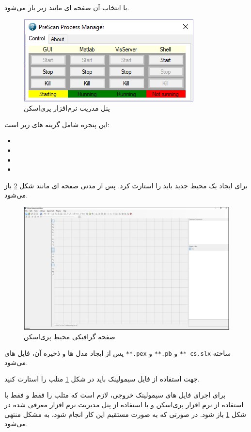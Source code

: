 با انتخاب آن صفحه ای مانند زیر باز می‌شود.

\begin{figure}[h]
	\centering
	\includegraphics[width=0.5\linewidth]{Figures/Prescan-panel}
	\caption{پنل مدریت نرم‌افزار پری‌اسکن}
	\label{fig:prescan-panel}
\end{figure}

این پنجره شامل گزینه های زیر است:
\begin{multicols}{2}
	\begin{itemize}
		\item {}
		\item {}
		\item {}
		\item {}
	\end{itemize}
\end{multicols}

برای ایجاد یک محیط جدید باید  را استارت کرد. پس از مدتی صفحه ای مانند شکل 
\ref{fig:prescan-gui}
باز می‌شود. 


\begin{figure}
	\centering
	\includegraphics[width=0.7\linewidth]{Figures/Prescan-GUI}
	\caption{صفحه گرافیکی محیط پری‌اسکن}
	\label{fig:prescan-gui}
\end{figure}

پس از ایجاد مدل ها و ذخیره آن، فایل های \texttt{**.pex} و \texttt{**.pb} و \texttt{**\_cs.slx} ساخته می‌شود.

جهت استفاده از فایل سیمولینک باید در شکل 
\ref{fig:prescan-panel}
متلب را استارت کنید.
\begin{remark}
	برای اجرای فایل های سیمولینک خروجی، لازم است که متلب را فقط و فقط با استفاده از نرم افزار پری‌اسکن و با استفاده از پنل مدیریت نرم افزار معرفی شده در شکل 
	\ref{fig:prescan-panel}
	باز شود. در صورتی که به صورت مستقیم این کار انجام شود، به مشکل منتهی می‌شود.
\end{remark}


